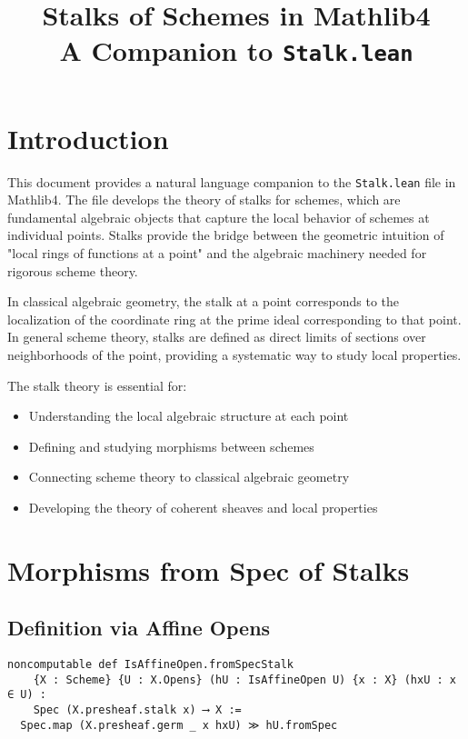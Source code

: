 \documentclass{article}
\title{Stalks of Schemes in Mathlib4\\
\large A Companion to \texttt{Stalk.lean}}
\author{}
\date{}
\theoremstyle{definition}
\begin{document}
\maketitle

\section{Introduction}

This document provides a natural language companion to the \texttt{Stalk.lean} file in Mathlib4. The file develops the theory of stalks for schemes, which are fundamental algebraic objects that capture the local behavior of schemes at individual points. Stalks provide the bridge between the geometric intuition of "local rings of functions at a point" and the algebraic machinery needed for rigorous scheme theory.

In classical algebraic geometry, the stalk at a point corresponds to the localization of the coordinate ring at the prime ideal corresponding to that point. In general scheme theory, stalks are defined as direct limits of sections over neighborhoods of the point, providing a systematic way to study local properties.

The stalk theory is essential for:
\begin{itemize}
\item Understanding the local algebraic structure at each point
\item Defining and studying morphisms between schemes
\item Connecting scheme theory to classical algebraic geometry
\item Developing the theory of coherent sheaves and local properties
\end{itemize}

\section{Morphisms from Spec of Stalks}

\subsection{Definition via Affine Opens}

\begin{lstlisting}
noncomputable def IsAffineOpen.fromSpecStalk
    {X : Scheme} {U : X.Opens} (hU : IsAffineOpen U) {x : X} (hxU : x ∈ U) :
    Spec (X.presheaf.stalk x) ⟶ X :=
  Spec.map (X.presheaf.germ _ x hxU) ≫ hU.fromSpec
\end{lstlisting}
\end{document}
